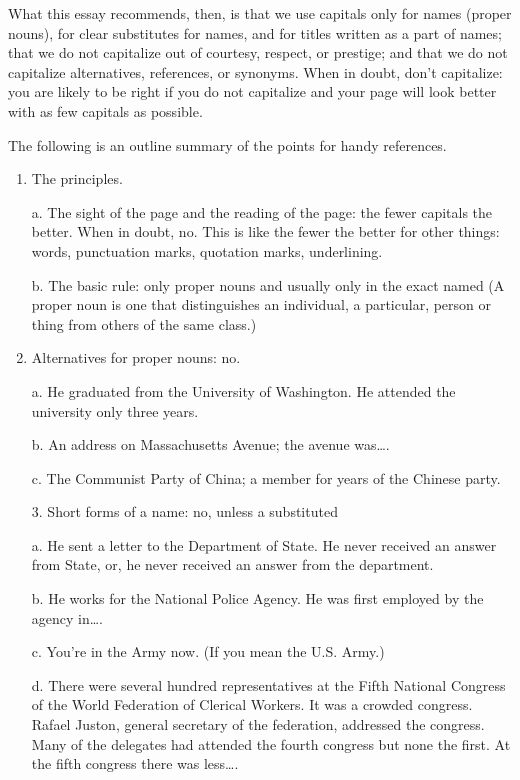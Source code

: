 \documentclass[
    oneside,
    11pt,
    draft
]{memoir}
\begin{document}
What this essay recommends, then, is that we use capitals only for names (proper nouns), for clear substitutes for names, and for titles written as a part of names; that we do not capitalize out of courtesy, respect, or prestige; and that we do not capitalize alternatives, references, or synonyms. When in doubt, don't capitalize: you are likely to be right if you do not capitalize and your page will look better with as few capitals as possible. 

The following is an outline summary of the points for handy references.
\begin{enumerate}
  \item The principles.

    a. The sight of the page and the reading of the page: the fewer capitals the better. When in doubt, no. This is like the fewer the better for other things: words, punctuation marks, quotation marks, underlining.

    b. The basic rule: only proper nouns and usually only in the exact named (A proper noun is one that distinguishes an individual, a particular, person or thing from others of the same class.)

  
    
    
  \item Alternatives for proper nouns: no. 
    
    a. He graduated from the University of Washington. He attended the university only three years.
    
    b. An address on Massachusetts Avenue; the avenue was\dots. 
    
    c. The Communist Party of China; a member for years of the Chinese party. 
    
    3. Short forms of a name: no, unless a substituted 
    
    a. He sent a letter to the Department of State. He never received an answer from State, or, he never received an answer from the department.
    
    b. He works for the National Police Agency. He was first employed by the agency in\dots. 
    
    c. You're in the Army now. (If you mean the U.S. Army.) 

    d. There were several hundred representatives at the Fifth National Congress of the World Federation of Clerical Workers. It was a crowded congress. Rafael Juston, general secretary of the federation, addressed the congress. Many of the delegates had attended the fourth congress but none the first. At the fifth congress there was less\dots. 


\end{enumerate}
\end{document}
